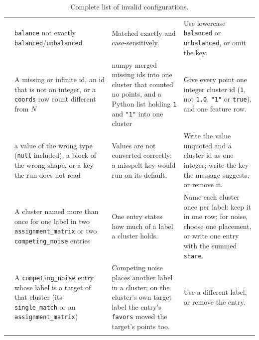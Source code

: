 \documentclass[a4paper,11pt]{article}
\newcommand{\vcode}[1]{\textcolor{valred}{\bfseries\ttfamily #1}}
\begin{document}
\begin{longtable}{@{}L{1.0cm} L{3.5cm} L{4.6cm} L{5.4cm}@{}}
\vcode{132} & \texttt{balance} not exactly \texttt{balanced}/\texttt{unbalanced} & Matched exactly and case-sensitively. & Use lowercase \texttt{balanced} or \texttt{unbalanced}, or omit the key. \\
\vcode{133} & A missing or infinite id, an id that is not an integer, or a \texttt{coords} row count different from $N$ & numpy merged missing ids into one cluster that counted no points, and a Python list holding \texttt{1} and \texttt{"1"} into one cluster & Give every point one integer cluster id (\texttt{1}, not \texttt{1.0}, \texttt{"1"} or \texttt{true}), and one feature row.\\
\hline
\vcode{141} & a value of the wrong type (\texttt{null} included), a block of the wrong shape, or a key the run does not read & Values are not converted correctly; a misspelt key would run on its default. & Write the value unquoted and a cluster id as one integer; write the key the message suggests, or remove it. \\
\vcode{142} & A cluster named more than once for one label in two \texttt{assignment\_matrix} or two \texttt{competing\_noise} entries & One entry states how much of a label a cluster holds. & Name each cluster once per label: keep it in one row; for noise, choose one placement, or write one entry with the summed \texttt{share}. \\
\vcode{144} & A \texttt{competing\_noise} entry whose label is a target of that cluster (its \texttt{single\_match} or an \texttt{assignment\_matrix}) & Competing noise places another label in a cluster; on the cluster's own target label the entry's \texttt{favors} moved the target's points too. & Use a different label, or remove the entry. \\
\bottomrule
\caption{Complete list of invalid configurations.}
\label{LIC}
\end{longtable}

\newpage
\end{document}
